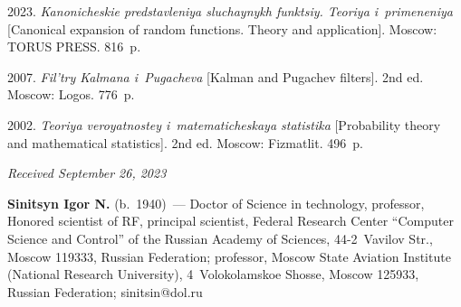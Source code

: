 \begin{multicols}{2}
{{\begin{thebibliography}{99}
 2023.
\textit{Kanonicheskie predstavleniya slu\-chay\-nykh funktsiy. Teoriya i~primeneniya} [Canonical expansion of random functions. Theory and application].
 Moscow: TORUS PRESS. 816~p.

 2007. 
\textit{Fil'try Kalmana i~Pugacheva} [Kalman and Pugachev filters]. 2nd ed. Moscow: Logos. 776~p.

 2002. 
\textit{Teoriya veroyatnostey i~ma\-te\-ma\-ti\-che\-skaya sta\-ti\-sti\-ka} [Probability theory and mathematical statistics]. 2nd ed. Moscow: Fizmatlit. 496~p.

 \end{thebibliography}

 }
 }

\end{multicols}

\vspace*{-6pt}

\hfill{\small\textit{Received September 26, 2023}} 

\vspace*{-18pt}
     
     \Contrl
     
     \vspace*{-3pt}

\noindent
\textbf{Sinitsyn Igor N.} (b.\ 1940)~--- 
Doctor of Science in technology, professor, Honored scientist of RF, principal scientist, Federal Research 
Center ``Computer Science and Control'' of the Russian Academy of Sciences, 44-2~Vavilov Str., Moscow 119333, Russian Federation; 
professor, Moscow State Aviation Institute (National Research University), 4~Volokolamskoe Shosse, Moscow 125933, Russian Federation; 
\mbox{sinitsin@dol.ru}

\label{end\stat}

\renewcommand{\bibname}{\protect\rm Литература} 
      